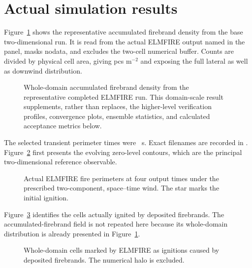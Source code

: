 \section{Actual simulation results}

Figure~\ref{fig:domain-result} shows the representative accumulated firebrand density from the base two-dimensional run.
It is read from the actual ELMFIRE output named in the panel, masks nodata, and excludes
the two-cell numerical buffer.  Counts are divided by physical cell area, giving pcs m$^{-2}$ and exposing the full lateral as well as downwind distribution.

\begin{figure}[H]
\centering
{}
\caption{Whole-domain accumulated firebrand density from the representative completed ELMFIRE run.  This
domain-scale result supplements, rather than replaces, the higher-level verification
profiles, convergence plots, ensemble statistics, and calculated acceptance metrics below.}
\label{fig:domain-result}
\end{figure}


The selected transient perimeter times were
~s. Exact filenames are recorded in
.
Figure~\ref{fig:perimeters} first presents the evolving zero-level contours,
which are the principal two-dimensional reference observable.

\begin{figure}[H]
\centering
{}
\caption{Actual ELMFIRE fire perimeters at four output times under the
prescribed two-component, space--time wind. The star marks the initial ignition.}
\label{fig:perimeters}
\end{figure}

Figure~\ref{fig:f2d-fields} identifies the cells actually ignited by deposited
firebrands. The accumulated-firebrand field is not repeated here because its
whole-domain distribution is already presented in Figure~\ref{fig:domain-result}.

\begin{figure}[H]
\centering
{}
\caption{Whole-domain cells marked by ELMFIRE as ignitions caused by deposited
firebrands. The numerical halo is excluded.}
\label{fig:f2d-fields}
\end{figure}

